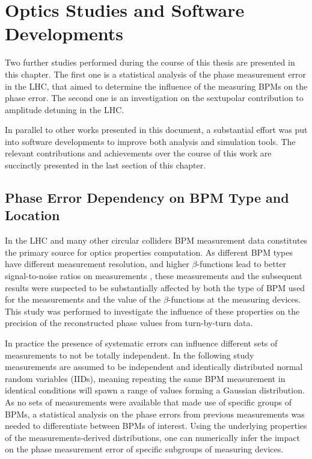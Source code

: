 \chapter{Optics Studies and Software Developments}
\label{chapter:Others_and_Software}

Two further studies performed during the course of this thesis are presented in this chapter.
The first one is a statistical analysis of the phase measurement error in the LHC, that aimed to determine the influence of the measuring BPMs on the phase error.
The second one is an investigation on the sextupolar contribution to amplitude detuning in the LHC.

In parallel to other works presented in this document, a substantial effort was put into software developments to improve both analysis and simulation tools.
The relevant contributions and achievements over the course of this work are succinctly presented in the last section of this chapter.


\section{Phase Error Dependency on BPM Type and Location}

In the LHC and many other circular colliders BPM measurement data constitutes the primary source for optics properties computation.
As different BPM types~\cite{CERN:Equipment_Codes} have different measurement resolution, and higher \(\beta\)-functions lead to better signal-to-noise ratios on measurements , these measurements and the subsequent results were suspected to be substantially affected by both the type of BPM used for the measurements and the value of the \(\beta\)-functions at the measuring devices.
This study was performed to investigate the influence of these properties on the precision of the reconstructed phase values from turn-by-turn data.

In practice the presence of systematic errors can influence different sets of measurements to not be totally independent.
In the following study measurements are assumed to be independent and identically distributed normal random variables (IIDs), meaning repeating the same BPM measurement in identical conditions will spawn a range of values forming a Gaussian distribution.
As no sets of measurements were available that made use of specific groups of BPMs, a statistical analysis on the phase errors from previous measurements was needed to differentiate between BPMs of interest. 
Using the underlying properties of the measurements-derived distributions, one can numerically infer the impact on the phase measurement error of specific subgroups of measuring devices.

